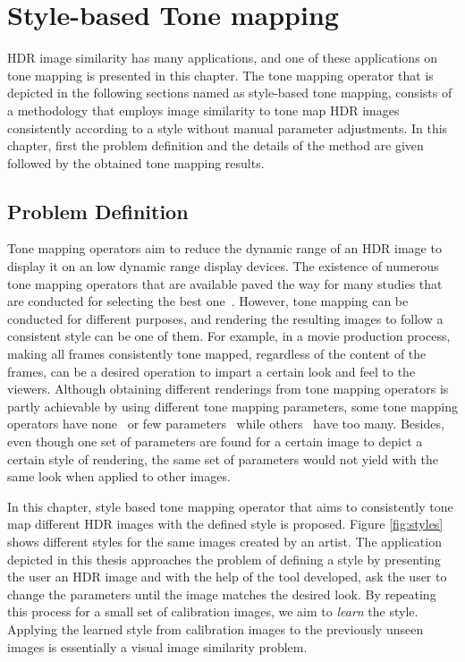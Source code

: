 \chapter{Style-based Tone mapping}
\label{chp:b4}

HDR image similarity has many applications, and one of these applications on tone mapping is presented in this chapter. The tone mapping operator that is depicted in the following sections named as style-based tone mapping, consists of a methodology that employs image similarity to tone map HDR images consistently according to a style without manual parameter adjustments. In this chapter, first the problem definition and the details of the method are given followed by the obtained tone mapping results.

\section{Problem Definition}

Tone mapping operators aim to reduce the dynamic range of an HDR image to display it on an low dynamic range display devices. The existence of numerous tone mapping operators that are available paved the way for many studies that are conducted for selecting the best one~\cite{parraga2018tone}. However, tone mapping can be conducted for different purposes, and rendering the resulting images to follow a consistent style can be one of them. For example, in a movie production process, making all frames consistently tone mapped, regardless of the content of the frames, can be a desired operation to impart a certain look and feel to the viewers. Although obtaining different renderings from tone mapping operators is partly achievable by using different tone mapping parameters, some tone mapping operators have none~\cite{Dura02} or few parameters~\cite{Fatt02} while others~\cite{Photomatix2010} have too many. Besides, even though one set of parameters are found for a certain image to depict a certain style of rendering, the same set of parameters would not yield with the same look when applied to other images. %

In this chapter, style based tone mapping operator that aims to consistently tone map different HDR images with the defined style is proposed. Figure \ref{fig:styles} shows different styles for the same images created by an artist. The application depicted in this thesis approaches the problem of defining a style by presenting the user an HDR image and with the help of the tool developed, ask the user to change the parameters until the image matches the desired look. By repeating this process for a small set of calibration images, we aim to \emph{learn} the style. Applying the learned style from calibration images to the previously unseen images is essentially a visual image similarity problem.

